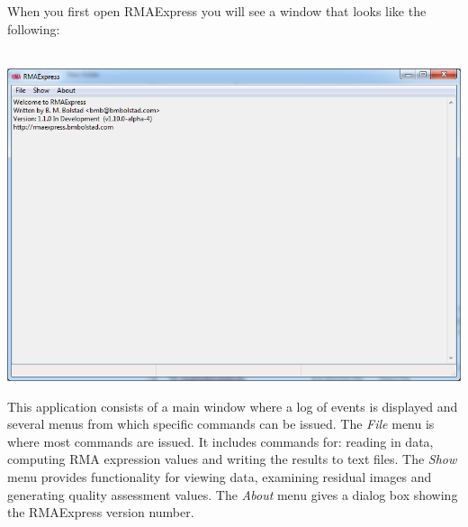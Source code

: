 \documentclass[11pt]{report}
\begin{document}
When you first open RMAExpress you will see a window that looks like the following: \\ \\
\begin{center}
\includegraphics[scale=0.5]{mainwindow}
\end{center}

This application consists of a main window where a log of events is displayed and several menus from which specific commands can be issued. The {\it File} menu is where most commands are issued. It includes commands for: reading in data, computing RMA expression values and writing the results to text files. The {\it Show} menu provides functionality for viewing data, examining residual images and generating quality assessment values. The {\it About} menu gives a dialog box showing the RMAExpress version number.
\end{document}
